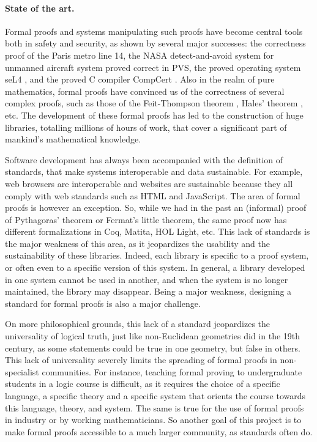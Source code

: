 \paragraph{State of the art.}
Formal proofs and systems manipulating such proofs have become
central tools both in safety and security, as shown by several major
successes: the correctness proof of the Paris metro line 14, the NASA
detect-and-avoid system for unmanned aircraft system proved correct in
PVS, the proved operating system seL4 \cite{Klein09}, and the proved C
compiler CompCert \cite{Leroy06}.  Also in the realm of pure mathematics,
formal proofs have convinced us of the
correctness of several complex proofs, such as those of the Feit-Thompson
theorem \cite{Gonthier13}, Hales' theorem
\cite{Hales17}, etc.  The development of these formal proofs has led
to the construction of huge libraries, totalling millions of hours of
work, that cover a significant part of mankind's mathematical knowledge.

Software development has always been accompanied with the definition
of standards, that make systems interoperable and data
sustainable. For example, web browsers are interoperable and websites
are sustainable because they all comply with web standards such as HTML
and JavaScript. The
area of formal proofs is however an exception. So, while we had in the
past an (informal) proof of Pythagoras' theorem or Fermat's little
theorem, the same proof now has different formalizations in {\sc Coq},
{\sc Matita}, {\sc HOL Light}, etc. This lack of standards is the
major weakness of this area, as it jeopardizes the usability and the
sustainability of these libraries. Indeed, each library is specific to
a proof system, or often even to a specific version of this
system. In general, a library developed in one system cannot be used
in another, and when the system is no longer maintained, the library may
disappear. Being a major weakness, designing a standard for formal
proofs is also a major challenge.

On more philosophical grounds, this lack of a standard jeopardizes the
universality of logical truth, just like non-Euclidean geometries
did in the 19th century, as some statements could be true in one
geometry, but false in others.  This lack of universality severely
limits the spreading of formal proofs in non-specialist
communities. For instance, teaching formal proving to undergraduate
students in a logic course is difficult, as it
requires the choice of a specific language, a specific theory and a specific system that
orients the course towards this language, theory, and
system. The same is true for the use of formal proofs in
industry or by working mathematicians. So another goal of this project
is to make formal proofs accessible to a much larger community, as
standards often do.

